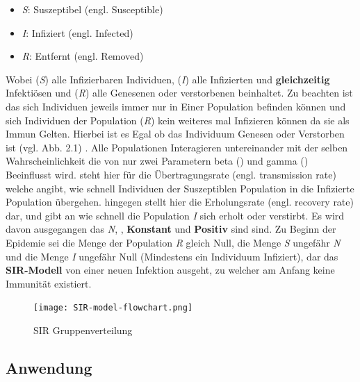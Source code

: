 \documentclass[12pt]{scrartcl} %
\begin{document}
\begin{itemize}
	\item \textit{S}: Suszeptibel (engl. Susceptible)
	\item \textit{I}: Infiziert (engl. Infected)
	\item \textit{R}: Entfernt (engl. Removed)
\end{itemize}
\normalsize

Wobei (\textit{S}) alle Infizierbaren Individuen, (\textit{I}) alle Infizierten und \textbf{gleichzeitig} Infektiösen und (\textit{R}) alle Genesenen oder verstorbenen beinhaltet.  Zu beachten ist das sich Individuen jeweils immer nur in Einer Population befinden können und sich Individuen der Population 
(\textit{R}) kein weiteres mal Infizieren können da sie als Immun Gelten. Hierbei ist es Egal ob das Individuum Genesen oder Verstorben ist (vgl. Abb. 2.1) \cite{4}.
Alle Populationen Interagieren untereinander mit der selben Wahrscheinlichkeit die von nur zwei Parametern beta (\textbeta) und gamma (\textgamma) Beeinflusst wird. 
\textbeta \space steht hier für die Übertragungsrate (engl. transmission rate) welche angibt, wie schnell Individuen der Suszeptiblen Population in die Infizierte Population übergehen. 
\textgamma \space hingegen stellt hier die Erholungsrate (engl. recovery rate) dar, und gibt an wie schnell die Population \textit{I} sich erholt oder verstirbt.
Es wird davon ausgegangen das \textit{N}, \textbeta, \textgamma \space \textbf{Konstant} und \textbf{Positiv} sind sind.
Zu Beginn der Epidemie sei die Menge der Population \textsl{R} gleich Null, die Menge \textsl{S} ungefähr \textit{N} und die Menge \textit{I} ungefähr Null (Mindestens ein Individuum Infiziert), dar das \textbf{SIR-Modell} von einer neuen Infektion ausgeht, zu welcher am Anfang keine Immunität existiert.

	\begin{figure}[h]
	\centering
	\texttt{[image: SIR-model-flowchart.png]} 
	\caption{SIR Gruppenverteilung}
	\end{figure}


\subsection{Anwendung}
\end{document}
